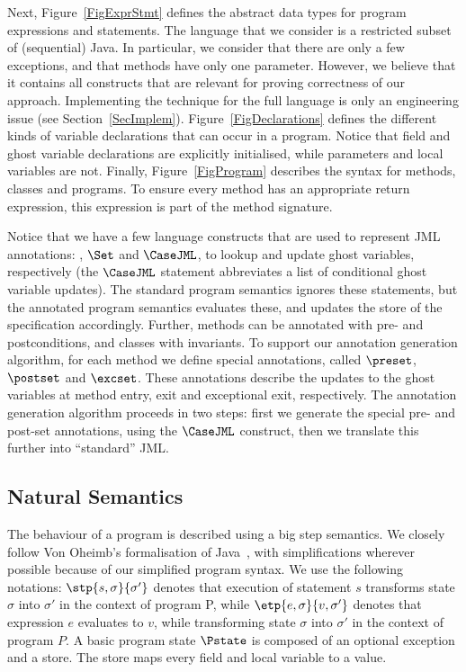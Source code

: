 Next, Figure~\ref{FigExprStmt} defines the abstract data types for
program expressions and statements.  The language that we consider is
a restricted subset of (sequential) Java. In particular, we consider
that there are only a few exceptions, and that methods have only one
parameter. However, we believe that it contains all constructs that
are relevant for proving correctness of our approach. Implementing the
technique for the full language is only an engineering issue (see
Section~\ref{SecImplem}).  Figure~\ref{FigDeclarations} defines the
different kinds of variable declarations that can occur in a
program. Notice that field and ghost variable declarations are
explicitly initialised, while parameters and local variables are
not. Finally, Figure~\ref{FigProgram} describes the syntax for
methods, classes and programs. To ensure every method has an
appropriate return expression, this expression is part of the method
signature.

Notice that we have a few language constructs that are used to
represent JML annotations: \EvalG, \(\Set\) and
\(\CaseJML\), to lookup and update ghost variables, respectively (the
\(\CaseJML\) statement abbreviates a list of conditional ghost
variable updates).  The standard program semantics ignores these
statements, but the annotated program semantics evaluates these, and
updates the store of the specification accordingly.  Further, methods
can be annotated with pre- and postconditions, and classes with
invariants. To support our annotation generation algorithm, for each
method we define special annotations, called
\(\preset\), \(\postset\) and \(\excset\). These annotations describe 
the updates to the ghost variables at method entry, exit and
exceptional exit, respectively. The annotation generation algorithm
proceeds in two steps: first we generate the special pre- and post-set
annotations, using the \(\CaseJML\) construct, then we translate this
further into ``standard'' JML.

\subsection{Natural Semantics}\label{SecSemantics}
The behaviour of a program is described using a big step semantics. We
closely follow Von Oheimb's formalisation of Java~\cite{Oheimb01},
with simplifications wherever possible because of our simplified
program syntax. We use the following notations:
$\stp{s,\sigma}{\sigma'}$ denotes that execution of statement $s$
transforms state $\sigma$ into $\sigma'$ in the context of program P,
while $\etp{e,\sigma}{v,\sigma'}$ denotes that expression $e$
evaluates to $v$, while transforming state $\sigma$ into $\sigma'$ in
the context of program \(P\). A basic program state \(\Pstate\) is
composed of an optional exception and a store.  The store maps every
field and local variable to a value.

